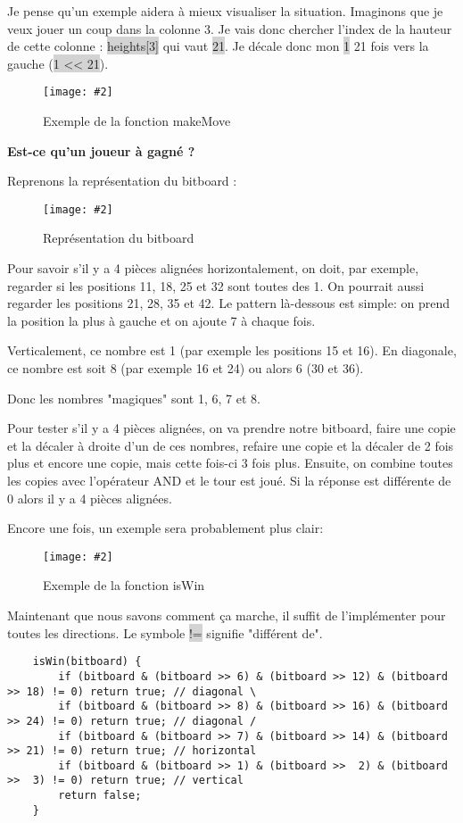 \documentclass[a4paper]{article}
\newcommand{\img}[3][]{
    \begin{figure}[H]
        \centering
        \texttt{[image: \#2]}
        \caption{#1}    
    \end{figure}
}
\newcommand{\inlinecode}[1]{\colorbox{lightgray}{#1}}
\newcommand{\ptitle}[1]{\vspace{10pt}
{\large \textbf{#1}}}
\begin{document}
    Je pense qu'un exemple aidera à mieux visualiser la situation. Imaginons que je veux jouer un coup dans la colonne 3. Je vais donc chercher l'index de la hauteur de cette colonne : \inlinecode{heights[3]} qui vaut \inlinecode{21}. Je décale donc mon \inlinecode{1} 21 fois vers la gauche (\inlinecode{1 << 21}).

    \img[Exemple de la fonction makeMove]{Images/ExempleMakeMove.png}{1}

    \newpage
    \ptitle{Est-ce qu'un joueur à gagné ?}

    Reprenons la représentation du bitboard :
    \img[Représentation du bitboard]{Images/BitBoard.png}{0.5}
    Pour savoir s'il y a 4 pièces alignées horizontalement, on doit, par exemple, regarder si les positions 11, 18, 25 et 32 sont toutes des 1. On pourrait aussi regarder les positions 21, 28, 35 et 42. Le pattern là-dessous est simple: on prend la position la plus à gauche et on ajoute 7 à chaque fois.

    Verticalement, ce nombre est 1 (par exemple les positions 15 et 16). En diagonale, ce nombre est soit 8 (par exemple 16 et 24) ou alors 6 (30 et 36).

    Donc les nombres "magiques" sont 1, 6, 7 et 8.

    Pour tester s'il y a 4 pièces alignées, on va prendre notre bitboard, faire une copie et la décaler à droite d'un de ces nombres, refaire une copie et la décaler de 2 fois plus et encore une copie, mais cette fois-ci 3 fois plus. Ensuite, on combine toutes les copies avec l'opérateur AND et le tour est joué. Si la réponse est différente de 0 alors il y a 4 pièces alignées.

    Encore une fois, un exemple sera probablement plus clair:
    \img[Exemple de la fonction isWin]{Images/ExempleIsWin.png}{0.8}

    Maintenant que nous savons comment ça marche, il suffit de l'implémenter pour toutes les directions. Le symbole \inlinecode{!=} signifie "différent de".
    \begin{lstlisting}
    isWin(bitboard) {
        if (bitboard & (bitboard >> 6) & (bitboard >> 12) & (bitboard >> 18) != 0) return true; // diagonal \
        if (bitboard & (bitboard >> 8) & (bitboard >> 16) & (bitboard >> 24) != 0) return true; // diagonal /
        if (bitboard & (bitboard >> 7) & (bitboard >> 14) & (bitboard >> 21) != 0) return true; // horizontal
        if (bitboard & (bitboard >> 1) & (bitboard >>  2) & (bitboard >>  3) != 0) return true; // vertical
        return false;
    }
    \end{lstlisting}
\end{document}

